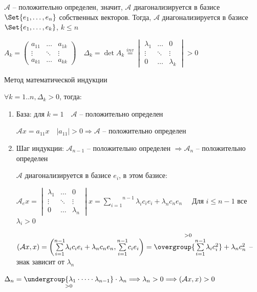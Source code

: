 \documentclass[12pt]{article}
\begin{document}
    \begin{MyProof}

        \fbox{$\Longrightarrow$} $\mathcal{A}$ -- положительно определен, значит, $\mathcal{A}$ диагонализируется в базисе $\Set{e_1, \dots, e_n}$ собственных векторов.
        Тогда, $\mathcal{A}$ диагонализируется в базисе $\Set{e_1, \dots, e_k}$, $k \leq n$

        $A_k = \begin{pmatrix}a_{11} & \dots & a_{1k} \\ \vdots & \ddots & \vdots \\ a_{k1} & \dots & a_{kk}\end{pmatrix} \quad
        \Delta_k = \det A_k \stackrel{inv}{=} \begin{vmatrix}\lambda_{1} & \dots & 0 \\ \vdots & \ddots & \vdots \\ 0 & \dots & \lambda_{k}\end{vmatrix} > 0$

        \fbox{$\Longleftarrow$} Метод математической индукции

        $\forall k = 1..n, \Delta_k > 0$, тогда:

        \begin{enumerate}
            \item База: для $k = 1 \quad \mathcal{A}$ -- положительно определен

            $\mathcal{A}x = a_{11}x \quad |a_{11}| > 0 \Longrightarrow \mathcal{A}$ -- положительно определен

            \item Шаг индукции: $\mathcal{A}_{n-1}$ -- положительно определен $\Longrightarrow \mathcal{A}_n$ -- положительно определен

            $\mathcal{A}$ диагонализируется в базисе ${e_i}$, в этом базисе:
            
            $\mathcal{A}_e x =
            \begin{vmatrix}\lambda_{1} & \dots & 0 \\ \vdots & \ddots & \vdots \\ 0 & \dots & \lambda_{n}\end{vmatrix}x =
            \overset{n - 1}{\underset{i = 1}{\sum}}\lambda_i c_i e_i + \lambda_n c_n e_n \quad$ Для $i \leq n - 1$ все $\lambda_i > 0$

            $(\mathcal{A}x, x) = \left(\overset{n - 1}{\underset{i = 1}{\sum}} \lambda_i c_i e_i + \lambda_n c_n e_n,
            \overset{n - 1}{\underset{i = 1}{\sum}} c_i e_i\right) = \overset{> 0}{\overgroup{\overset{n - 1}{\underset{i = 1}{\sum}} \lambda_i c_i^2}} + \lambda_n c_n^2$ -- знак зависит от $\lambda_n$
        \end{enumerate}

        $\Delta_n = \underset{> 0}{\undergroup{\lambda_1 \cdot \dots \cdot \lambda_{n-1}}} \cdot \lambda_n
        \Longrightarrow \lambda_n > 0 \Longrightarrow (\mathcal{A}x, x) > 0$

    \end{MyProof}
\end{document}
